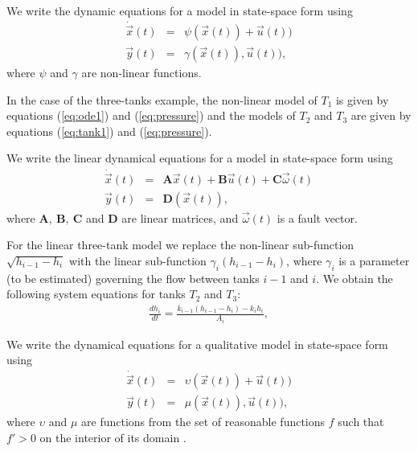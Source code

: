 \begin{definition}
We write the dynamic equations for a model in state-space form using
\begin{eqnarray}\label{eq:nonlinear}
\dot{\vec{x}}(t) & = & \psi (\vec{x}(t)) + \vec{u}(t))\\
\vec{y}(t) & = & \gamma (\vec{x}(t)), \vec{u}(t)),
\end{eqnarray}
where $\psi$ and $\gamma$ are non-linear functions.
\end{definition}
%
In the case of the three-tanks example, the non-linear model of $T_1$
is given by equations (\ref{eq:ode1}) and (\ref{eq:pressure}) and the
models of $T_2$ and $T_3$ are given by equations (\ref{eq:tank1}) and
(\ref{eq:pressure}).
%
\begin{definition}
We write the linear dynamical equations for a model in state-space form using
\begin{eqnarray}\label{eq:linear}
\dot{\vec{x}}(t) & = & \mathbf{A} \vec{x}(t) + \mathbf{B} \vec{u}(t) + \mathbf{C} \vec{\omega}(t)\\ %
\vec{y}(t) & = & \mathbf{D} (\vec{x}(t)),
\end{eqnarray}
where $\mathbf{A}, ~ \mathbf{B},~\mathbf{C}$ and $\mathbf{D}$ are linear matrices, and
$\vec{\omega}(t)$ is a fault vector.
\end{definition}
%
For the linear three-tank model we replace the non-linear sub-function
$\sqrt{h_{i - 1} - h_i}$ with the linear sub-function $\gamma_i (h_{i
- 1} - h_i)$, where $\gamma_i$ is a parameter (to be estimated)
governing the flow between tanks $i - 1$ and $i$. We obtain the
following system equations for tanks $T_2$ and $T_3$:
%
\begin{eqnarray}\label{eq:lineartank}
%
\frac{d h_i}{dt} = \frac{k_{i - 1}(h_{i - 1} - h_{i}) - k_i {h_i}}{A_i},
%
\end{eqnarray}
%
\begin{definition}
We write the dynamical equations for a qualitative model in state-space form using
\begin{eqnarray}\label{qual-model}
\dot{\vec{x}}(t) & = & \upsilon (\vec{x}(t)) + \vec{u}(t))\\
\vec{y}(t) & = & \mu (\vec{x}(t)), \vec{u}(t)),
\end{eqnarray}
where $\upsilon$ and $\mu$ are functions from the set of reasonable
functions $f$ such that $f' > 0$ on the interior of its domain
\citep{kuipers1994composition}.
\end{definition}
